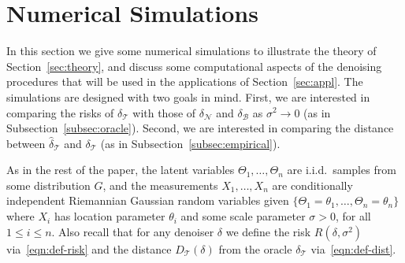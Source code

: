 \documentclass[preprint]{imsart}
\theoremstyle{plain}
\theoremstyle{definition}
\newcommand{\B}{\mathcal{B}}
\newcommand{\N}{\mathcal{N}}
\newcommand{\T}{\mathcal{T}}
\begin{document}
\section{Numerical Simulations}\label{sec:sim}

In this section we give some numerical simulations to illustrate the theory of Section~\ref{sec:theory}, and discuss some computational aspects of the denoising procedures that will be used in the applications of Section~\ref{sec:appl}.
The simulations are designed with two goals in mind.
First, we are interested in comparing the risks of $\delta_{\T}$ with those of $\delta_{\N}$ and $\delta_{\B}$ as $\sigma^2\to 0$ (as in Subsection~\ref{subsec:oracle}).
Second, we are interested in comparing the distance between $\hat{\delta}_{\T}$ and $\delta_{\T}$ (as in Subsection~\ref{subsec:empirical}).

As in the rest of the paper, the latent variables $\Theta_1,\ldots, \Theta_n$ are i.i.d.~samples from some distribution $G$, and the measurements $X_1,\ldots, X_n$ are conditionally independent Riemannian Gaussian random variables given $\{\Theta_1=\theta_1,\ldots, \Theta_n=\theta_n\}$ where $X_i$ has location parameter $\theta_i$ and some scale parameter $\sigma>0$, for all $1\le i\le n$.
Also recall that for any denoiser $\delta$ we define the risk $R(\delta,\sigma^2)$ via~\eqref{eqn:def-risk} and the distance $D_{\T}(\delta)$ from the oracle $\delta_{\T}$ via~\eqref{eqn:def-dist}.
\end{document}

